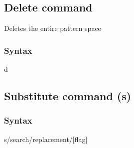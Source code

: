 \documentclass{report}
\begin{document}
    \bigbreak \noindent 
    \subsection{Delete command}
    \bigbreak \noindent 
    Deletes the entire pattern space
    \bigbreak \noindent 
    \bigbreak \noindent 
    \subsubsection{Syntax}
    \bigbreak \noindent 
    \begin{bashcode}
    [address] d 
    \end{bashcode}

    \bigbreak \noindent 
    \subsection{Substitute command (s)}
    \bigbreak \noindent 
    \subsubsection{Syntax}
    \bigbreak \noindent 
    \begin{bashcode}
        [address] s/search/replacement/[flag]
    \end{bashcode}













    
\end{document}
